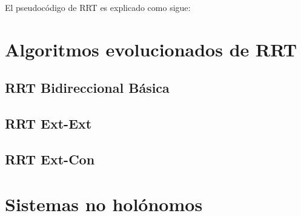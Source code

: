 \bigskip{}


El pseudocódigo de RRT es explicado como sigue:


\section{Algoritmos evolucionados de RRT}


\subsection{RRT Bidireccional Básica}


\subsection{RRT Ext-Ext}


\subsection{RRT Ext-Con}


\section{Sistemas no holónomos}

%
